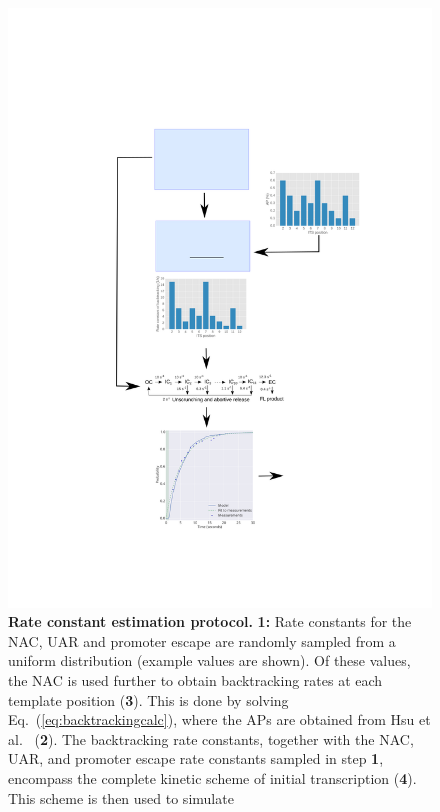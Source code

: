 \begin{figure}[h]
    \begin{center}
      \includegraphics{../illustrations/parameter_estimation_scheme}
    \end{center}
  \caption{ {\bf Rate constant estimation protocol.} \textbf{1:}
    Rate constants for the NAC, UAR and promoter escape are randomly sampled
    from a uniform distribution (example values are shown). Of these values,
    the NAC is used further to obtain backtracking rates at each template
    position (\textbf{3}). This is done by solving
    Eq.~(\ref{eq:backtrackingcalc}), where the APs are obtained from Hsu et
    al.\ \cite{hsu_initial_2006} (\textbf{2}). The backtracking rate
    constants, together with the NAC, UAR, and promoter escape rate constants
    sampled in step \textbf{1}, encompass the complete kinetic scheme of
    initial transcription (\textbf{4}). This scheme is then used to simulate
}
\end{figure}
